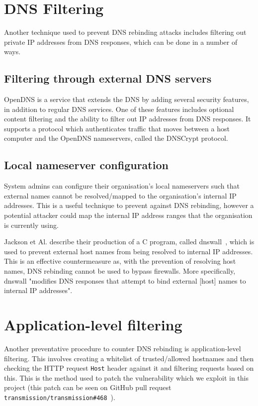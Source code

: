 \section{DNS Filtering}
\label{dns_filtering}

Another technique used to prevent DNS rebinding attacks includes
filtering out private IP addresses from DNS responses, which can be
done in a number of ways.

\subsection{Filtering through external DNS servers}

OpenDNS is a service that extends the DNS by adding several security
features, in addition to regular DNS services. One of these features
includes optional content filtering and the ability to filter out
IP addresses from DNS responses. It supports a protocol which
authenticates traffic that moves between a host computer and the
OpenDNS nameservers, called the DNSCrypt protocol.

\subsection{Local nameserver configuration}

System admins can configure their organisation's local nameservers
such that external names cannot be resolved/mapped to the organisation's
internal IP addresses. This is a useful technique to prevent against
DNS rebinding, however a potential attacker could map the internal
IP address ranges that the organisation is currently using.

Jackson et Al. describe their production of a C program, called
dnswall~\cite{jackson2009protecting}, which is used to prevent external
host names from being resolved to internal IP addresses. This is an effective
countermeasure as, with the prevention of resolving host names,
DNS rebinding cannot be used to bypass firewalls. More specifically,
dnswall "modifies DNS responses that attempt to bind external [host] names
to internal IP addresses".

\section{Application-level filtering}

Another preventative procedure to counter DNS rebinding is application-level
filtering. This involves creating a whitelist of trusted/allowed hostnames and
then checking the HTTP request \texttt{Host} header against it and filtering
requests based on this. This is the method used to patch the vulnerability
which we exploit in this project (this patch can be seen on GitHub pull
request \texttt{transmission/transmission\#468}~\cite{transmission_pr}).
